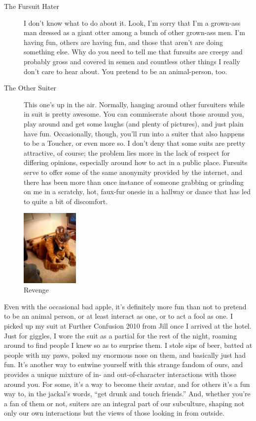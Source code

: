\begin{description}
  \item[The Fursuit Hater] I don't know what to do about it.  Look, I'm sorry that I'm a grown-ass man dressed as a giant otter among a bunch of other grown-ass men.  I'm having fun, others are having fun, and those that aren't are doing something else.  Why do you need to tell me that fursuits are creepy and probably gross and covered in semen and countless other things I really don't care to hear about.  You pretend to be an animal-person, too.
  \item[The Other Suiter] This one's up in the air.  Normally, hanging around other fursuiters while in suit is pretty awesome.  You can commiserate about those around you, play around and get some laughs (and plenty of pictures), and just plain have fun.  Occasionally, though, you'll run into a suiter that also happens to be a Toucher, or even more so.  I don't deny that some suits are pretty attractive, of course; the problem lies more in the lack of respect for differing opinions, especially around how to act in a public place.  Fursuits serve to offer some of the same anonymity provided by the internet, and there has been more than once instance of someone grabbing or grinding on me in a scratchy, hot, faux-fur onesie in a hallway or dance that has led to quite a bit of discomfort.
\end{description}

\begin{figure}
  \begin{center}
    \includegraphics[width=0.25\textwidth]{content/assets/dressing-up--revenge}
  \end{center}
  \caption{Revenge}
\end{figure}
Even with the occasional bad apple, it's definitely more fun than not to pretend to be an animal person, or at least interact as one, or to act a fool as one.  I picked up my suit at Further Confusion 2010 from Jill once I arrived at the hotel.  Just for giggles, I wore the suit as a partial for the rest of the night, roaming around to find people I knew so as to surprise them.  I stole sips of beer, batted at people with my paws, poked my enormous nose on them, and basically just had fun.  It's another way to entwine yourself with this strange fandom of ours, and provides a unique mixture of in- and out-of-character interactions with those around you.  For some, it's a way to become their avatar, and for others it's a fun way to, in the jackal's words, ``get drunk and touch friends.''  And, whether you're a fan of them or not, suiters are an integral part of our subculture, shaping not only our own interactions but the views of those looking in from outside.
